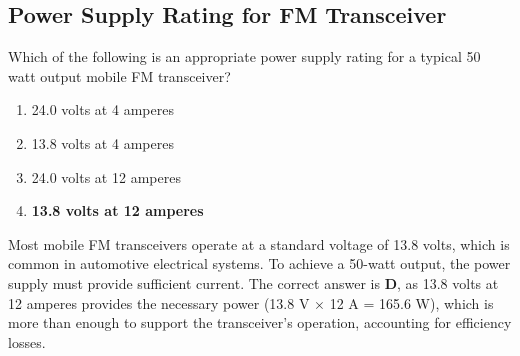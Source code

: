 \subsection{Power Supply Rating for FM Transceiver}
\label{T4A01}

\begin{tcolorbox}[colback=gray!10!white,colframe=black!75!black,title=T4A01]
Which of the following is an appropriate power supply rating for a typical 50 watt output mobile FM transceiver?
\begin{enumerate}[noitemsep]
    \item 24.0 volts at 4 amperes
    \item 13.8 volts at 4 amperes
    \item 24.0 volts at 12 amperes
    \item \textbf{13.8 volts at 12 amperes}
\end{enumerate}
\end{tcolorbox}

Most mobile FM transceivers operate at a standard voltage of 13.8 volts, which is common in automotive electrical systems. To achieve a 50-watt output, the power supply must provide sufficient current. The correct answer is \textbf{D}, as 13.8 volts at 12 amperes provides the necessary power (13.8 V $\times$ 12 A = 165.6 W), which is more than enough to support the transceiver's operation, accounting for efficiency losses.